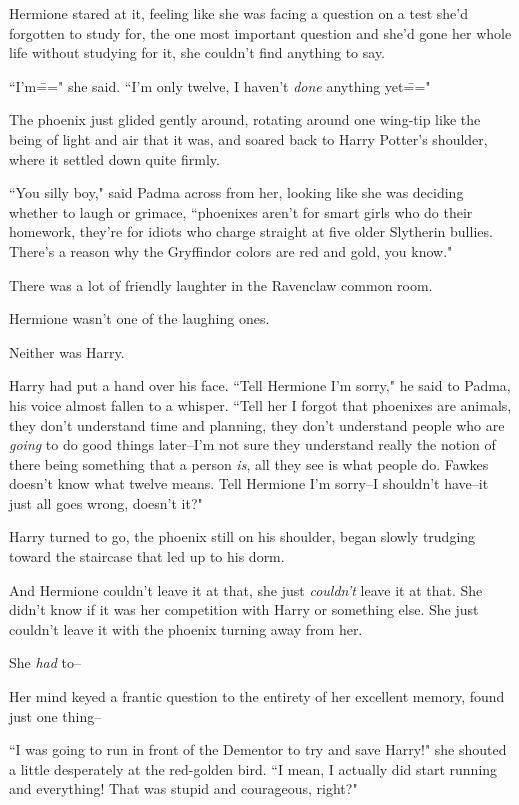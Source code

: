 Hermione stared at it, feeling like she was facing a question on a test she'd forgotten to study for, the one most important question and she'd gone her whole life without studying for it, she couldn't find anything to say.

``I'm\===" she said. ``I'm only twelve, I haven't \emph{done} anything yet\==="

The phoenix just glided gently around, rotating around one wing-tip like the being of light and air that it was, and soared back to Harry Potter's shoulder, where it settled down quite firmly.

``You silly boy," said Padma across from her, looking like she was deciding whether to laugh or grimace, ``phoenixes aren't for smart girls who do their homework, they're for idiots who charge straight at five older Slytherin bullies. There's a reason why the Gryffindor colors are red and gold, you know."

There was a lot of friendly laughter in the Ravenclaw common room.

Hermione wasn't one of the laughing ones.

Neither was Harry.

Harry had put a hand over his face. ``Tell Hermione I'm sorry," he said to Padma, his voice almost fallen to a whisper. ``Tell her I forgot that phoenixes are animals, they don't understand time and planning, they don't understand people who are \emph{going} to do good things later\---I'm not sure they understand really the notion of there being something that a person \emph{is}, all they see is what people do. Fawkes doesn't know what twelve means. Tell Hermione I'm sorry\---I shouldn't have\---it just all goes wrong, doesn't it?"

Harry turned to go, the phoenix still on his shoulder, began slowly trudging toward the staircase that led up to his dorm.

And Hermione couldn't leave it at that, she just \emph{couldn't} leave it at that. She didn't know if it was her competition with Harry or something else. She just couldn't leave it with the phoenix turning away from her.

She \emph{had} to\---

Her mind keyed a frantic question to the entirety of her excellent memory, found just one thing\---

``I was going to run in front of the Dementor to try and save Harry!" she shouted a little desperately at the red-golden bird. ``I mean, I actually did start running and everything! That was stupid and courageous, right?"

